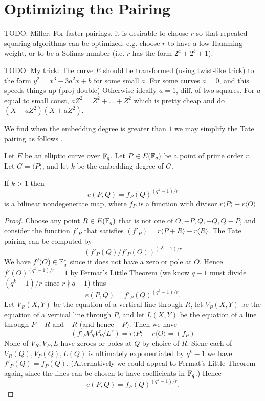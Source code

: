 \chapter{Optimizing the Pairing}

TODO: Miller:
For faster pairings, it is desirable to choose $r$ so that repeated squaring
algorithms can be optimized: e.g. choose $r$ to have a low Hamming weight,
or to be a Solinas number (i.e. $r$ has the form $2^a \pm 2^b \pm 1$).

TODO: My trick:
The curve $E$ should be transformed (using twist-like trick)
to the form $y^2 = x^3 - 3 a^2 x + b$ for some small $a$.
For some curves $a = 0$, and this speeds things up (proj double)
Otherwise ideally $a = 1$, diff. of two squares.
For $a$ equal to small const,
$aZ^2 =  Z^2 + ... + Z^2$ which is pretty cheap and
do $(X-aZ^2)(X+aZ^2)$.

We find when the embedding degree is greater than $1$ we may simplify
the Tate pairing as follows \cite{barreto, barreto2}.
\begin{theorem}
Let $E$ be an elliptic curve over $\mathbb{F}_q$.
Let $P \in E(\mathbb{F}_q)$ be a point of prime order $r$.
Let $G = \langle P \rangle$, and let $k$ be the embedding degree of $G$.

If $k > 1$ then
\[
e(P,Q) = f_P(Q)^{(q^k-1)/r}
\]
is a bilinear nondegenerate map,
where $f_P$ is a function with divisor $r\langle P\rangle - r\langle O\rangle$.
\end{theorem}

\begin{proof}
Choose any point $R \in E(\mathbb{F}_q)$ that is not one of
$O, -P, Q, -Q, Q - P$,
and consider the function $f'_P$ that satisfies $(f'_P) = r\langle P+R\rangle
- r\langle R \rangle$.
The Tate pairing can be computed by
\[
(f'_P(Q)/f'_P(O))^{(q^k-1)/r}
\]
We have $f'(O) \in \mathbb{F}_q^*$ since it does not have a zero or pole
at $O$. Hence
$f'(O)^{(q^k-1)/r} = 1$ by Fermat's Little Theorem (we know $q-1$ must
divide $(q^k - 1)/r$ since $r\nmid q-1$) thus
\[ e(P,Q) = f'_P(Q)^{(q^k-1)/r} . \]
Let $V_R(X,Y)$ be the equation of a vertical line through $R$,
let $V_P(X,Y)$ be the equation of a vertical line through $P$,
and let $L(X,Y)$ be the equation of a line through $P+R$ and $-R$ (and hence
$-P$).
Then we have
\[ (f'_P V_R^r V_P^r / L^r) = r \langle P \rangle - r \langle O \rangle
= (f_P) \]
None of $V_R, V_P, L$ have zeroes or poles at $Q$ by choice of $R$.
Sicne each of $V_R(Q), V_P(Q), L(Q)$ is ultimately exponentiated by $q^k-1$
we have $f'_P(Q) = f_P(Q)$.
(Alternatively we could appeal to Fermat's Little Theorem
again, since the lines can be chosen to have coefficients in $\mathbb{F}_q$.)
Hence
\[e(P,Q) = f_P(Q)^{(q^k-1)/r} . \]
\end{proof}


